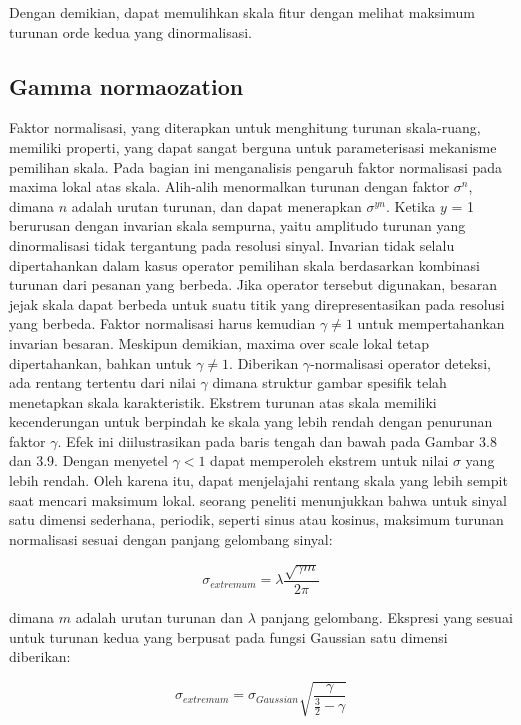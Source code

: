 Dengan demikian, dapat memulihkan skala fitur dengan melihat maksimum turunan orde kedua yang dinormalisasi.

\subsection{\textbf{Gamma normaozation}}
Faktor normalisasi, yang diterapkan untuk menghitung turunan skala-ruang, memiliki properti, yang dapat sangat 
berguna untuk parameterisasi mekanisme pemilihan skala. Pada bagian ini menganalisis pengaruh faktor 
normalisasi pada maxima lokal atas skala. Alih-alih menormalkan turunan dengan faktor \(\sigma^{n}\), 
dimana \(n\) adalah urutan turunan, dan dapat menerapkan \(\sigma^{yn}\). Ketika \(y\) = 1 berurusan 
dengan invarian skala sempurna, yaitu amplitudo turunan yang dinormalisasi tidak tergantung pada resolusi sinyal. 
Invarian tidak selalu dipertahankan dalam kasus operator pemilihan skala berdasarkan kombinasi turunan dari pesanan yang berbeda.
Jika operator tersebut digunakan, besaran jejak skala dapat berbeda untuk suatu titik yang direpresentasikan pada resolusi yang berbeda. 
Faktor normalisasi harus kemudian \(\gamma \neq 1\) untuk mempertahankan invarian besaran. Meskipun demikian, maxima over scale lokal tetap 
dipertahankan, bahkan untuk \(\gamma \neq 1\). Diberikan \(\gamma\)-normalisasi operator deteksi, ada rentang tertentu dari nilai \(\gamma\) 
dimana struktur gambar spesifik telah menetapkan skala karakteristik.
Ekstrem turunan atas skala memiliki kecenderungan untuk berpindah ke skala yang lebih rendah dengan penurunan faktor \(\gamma\). Efek ini diilustrasikan pada baris tengah dan bawah pada Gambar 3.8 dan 3.9. Dengan menyetel \(\gamma < 1\) dapat memperoleh ekstrem untuk nilai \(\sigma\) yang lebih rendah. 
Oleh karena itu, dapat menjelajahi rentang skala yang lebih sempit saat mencari maksimum lokal. seorang peneliti menunjukkan bahwa untuk 
sinyal satu dimensi sederhana, periodik, seperti sinus atau kosinus, maksimum turunan normalisasi sesuai dengan panjang gelombang sinyal:

\begin{equation}
  \sigma_{extremum} = \lambda \frac{\sqrt{\gamma m} }{2\pi }
\end{equation}

dimana \(m\) adalah urutan turunan dan \(\lambda\) panjang gelombang. Ekspresi yang sesuai untuk turunan kedua yang berpusat pada fungsi Gaussian satu dimensi diberikan:

\begin{equation}
  \sigma_{extremum} = \sigma_{Gaussian} \sqrt{\frac{\gamma}{\frac{3}{2}- \gamma}}
\end{equation}

